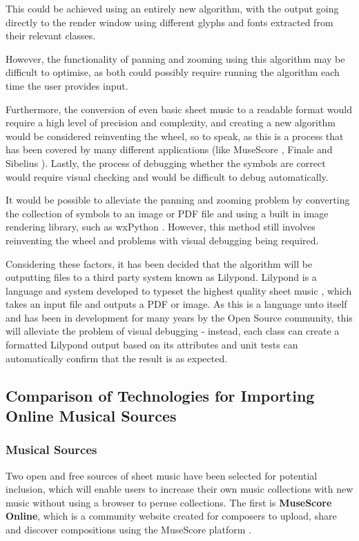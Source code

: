 This could be achieved using an entirely new algorithm, with the output going directly to the render window using different glyphs and fonts extracted from their relevant classes.

However, the functionality of panning and zooming using this algorithm may be difficult to optimise, as both could possibly require running the algorithm each time the user provides input. 

Furthermore, the conversion of even basic sheet music to a readable format would require a high level of precision and complexity, and creating a new algorithm would be considered reinventing the wheel, so to speak, as this is a process that has been covered by many different applications (like MuseScore \parencite{MuseTour}, Finale \parencite{mxml} and Sibelius \parencite{avid}). 
Lastly, the process of debugging whether the symbols are correct would require visual checking and would be difficult to debug automatically.

It would be possible to alleviate the panning and zooming problem by converting the collection of symbols to an image or PDF file and using a built in image rendering library, such as wxPython \parencite{WX}. However, this method still involves reinventing the wheel and problems with visual debugging being required.

Considering these factors, it has been decided that the algorithm will be outputting files to a third party system known as Lilypond. Lilypond is a language and system developed to typeset the highest quality sheet music \parencite{Lilypond}, which takes an input file and outputs a PDF or image. As this is a language unto itself and has been in development for many years by the Open Source community, this will alleviate the problem of visual debugging - instead, each class can create a formatted Lilypond output based on its attributes and unit tests can automatically confirm that the result is as expected.


\subsection{Comparison of Technologies for Importing Online Musical Sources}
\subsubsection{Musical Sources}
Two open and free sources of sheet music have been selected for potential inclusion, which will enable users to increase their own music collections with new music without using a browser to peruse collections. The first is \textbf{MuseScore Online}, which is a community website created for composers to upload, share and discover compositions using the MuseScore platform \parencite{MuseShare}.

